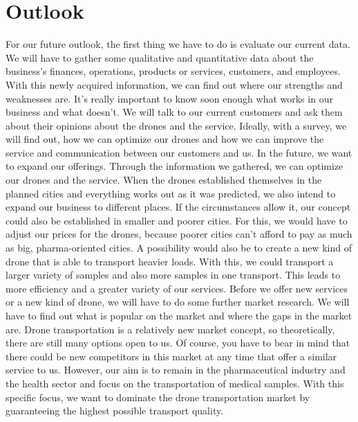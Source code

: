 \chapter{Outlook} \label{outlook}
For our future outlook, the first thing we have to do is evaluate our current data. We will have to gather some qualitative and quantitative data about the business's finances, operations, products or services, customers, and employees. With this newly acquired information, we can find out where our strengths and weaknesses are. It's really important to know soon enough what works in our business and what doesn't. We will talk to our current customers and ask them about their opinions about the drones and the service. Ideally, with a survey, we will find out, how we can optimize our drones and how we can improve the service and communication between our customers and us. In the future, we want to expand our offerings. Through the information we gathered, we can optimize our drones and the service. When the drones established themselves in the planned cities and everything works out as it was predicted, we also intend to expand our business to different places. If the circumstances allow it, our concept could also be established in smaller and poorer cities. For this, we would have to adjust our prices for the drones, because poorer cities can't afford to pay as much as big, pharma-oriented cities. A possibility would also be to create a new kind of drone that is able to transport heavier loads. With this, we could transport a larger variety of samples and also more samples in one transport. This leads to more efficiency and a greater variety of our services.
\newline
Before we offer new services or a new kind of drone, we will have to do some further market research. We will have to find out what is popular on the market and where the gaps in the market are. Drone transportation is a relatively new market concept, so theoretically, there are still many options open to us. Of course, you have to bear in mind that there could be new competitors in this market at any time that offer a similar service to us. However, our aim is to remain in the pharmaceutical industry and the health sector and focus on the transportation of medical samples. With this specific focus, we want to dominate the drone transportation market by guaranteeing the highest possible transport quality.
\newline
